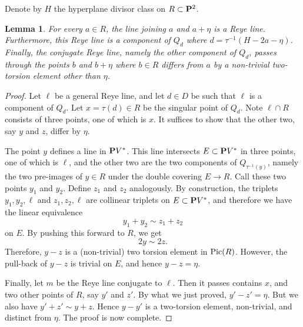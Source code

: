 \documentclass[11pt,reqno]{amsart}
\theoremstyle{plain}
\newtheorem{lemma}[theorem]{Lemma}
\theoremstyle{definition}
\theoremstyle{remark}
\numberwithin{equation}{section}
\renewcommand{\to}{{\longrightarrow}}
\numberwithin{equation}{section}
\begin{document}
Denote by $H$ the hyperplane divisor class on $R \subset \P^2$.
\begin{lemma}\label{lem:reye}
  For every $a \in R$, the line joining $a$ and $a+\eta$ is a Reye line.
  Furthermore, this Reye line is a component of $Q_d$ where $d = \tau^{-1}(H-2a-\eta)$.
  Finally, the conjugate Reye line, namely the other component of $Q_d$, passes through the points $b$ and $b+\eta$ where $b \in R$ differs from $a$ by a non-trivial two-torsion element other than $\eta$.
\end{lemma}
\begin{proof}
  Let $\ell$ be a general Reye line, and let $d \in D$ be such that $\ell$ is a component of $Q_d$.
  Let $x = \tau(d) \in R$ be the singular point of $Q_d$.
  Note $\ell \cap R$ consists of three points, one of which is $x$.
  It suffices to show that the other two, say $y$ and $z$, differ by $\eta$.

  The point $y$ defines a line in $\P V^*$.
  This line intersects $E \subset \P V^*$ in three points, one of which is $\ell$, and the other two are the two components of $Q_{\tau^{-1}(y)}$, namely the two pre-images of $y \in R$ under the double covering $E \to R$.
  Call these two points $y_1$ and $y_2$.
  Define $z_1$ and $z_2$ analogously.
  By construction, the triplets $y_1, y_2, \ell$ and $z_1, z_2, \ell$ are collinear triplets on $E \subset \P V^*$, and therefore we have the linear equivalence
  \[ y_1 + y_2 \sim z_1 + z_2\]
  on $E$.
  By pushing this forward to $R$, we get
  \[ 2y \sim 2z.\]
  Therefore, $y - z$ is a (non-trivial) two torsion element in $\Pic(R)$.
  However, the pull-back of $y-z$ is trivial on $E$, and hence $y - z = \eta$.

  Finally, let $m$ be the Reye line conjugate to $\ell$.
  Then it passes contains $x$, and two other points of $R$, say $y'$ and $z'$.
  By what we just proved, $y' - z' = \eta$.
  But we also have $y' + z' \sim y + z$.
  Hence $y - y'$ is a two-torsion element, non-trivial, and distinct from $\eta$.
  The proof is now complete.  
\end{proof}
\end{document}
